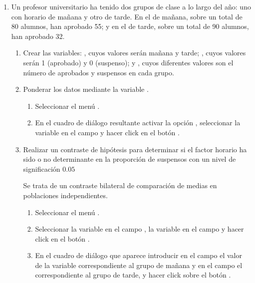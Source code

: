 \begin{enumerate}[leftmargin=*]
\item Un profesor universitario ha tenido dos grupos de clase a lo
largo del año: uno con horario de mañana y otro de tarde. En el de
mañana, sobre un total de 80 alumnos, han aprobado 55; y en el de
tarde, sobre un total de 90 alumnos, han aprobado 32.

\begin{enumerate}

\item Crear las variables: , cuyos valores serán
mañana y tarde; , cuyos valores serán 1
(aprobado) y 0 (suspenso); y , cuyos diferentes valores
son el número de aprobados y suspensos en cada grupo.

\item Ponderar los datos mediante la variable .
\begin{indicacion}
\begin{enumerate}
\item Seleccionar el menú .
\item En el cuadro de diálogo resultante activar la opción , seleccionar la variable  en el campo  y hacer click en el
botón .
\end{enumerate}
\end{indicacion}

\item Realizar un contraste de hipótesis para determinar si el
factor horario ha sido o no determinante en la proporción de
suspensos con un nivel de significación $0.05$
\begin{indicacion}
Se trata de un contraste bilateral de comparación de medias en poblaciones independientes.
\begin{enumerate}
\item Seleccionar el menú .
\item Seleccionar la variable  en el campo , la variable  en el campo  y hacer click en el botón .
\item En el cuadro de diálogo que aparece introducir en el campo  el valor de la variable
 correspondiente al grupo de mañana y en el campo  el correspondiente al grupo de tarde,
y hacer click sobre el botón .
\end{enumerate}
\end{indicacion}


\end{enumerate}

\end{enumerate}


